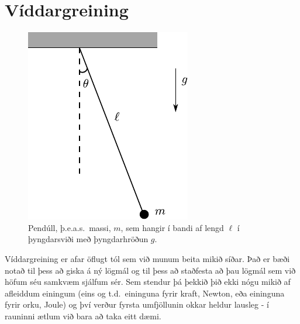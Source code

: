 \section{Víddargreining}


\begin{minipage}{\linewidth}
    

\begin{figure}
\vspace{-1cm}
\centering
\includegraphics{figures/pendull.pdf}
\caption{Pendúll, þ.e.a.s.~massi, $m$, sem hangir í bandi af lengd $\ell$ í þyngdarsviði með þyngdarhröðun $g$.}
\label{fig:pendull}
\end{figure}

Víddargreining er afar öflugt tól sem við munum beita mikið síðar. Það er bæði notað til þess að giska á ný lögmál og til þess að staðfesta að þau lögmál sem við höfum séu samkvæm sjálfum sér. Sem stendur þá þekkið þið ekki nógu mikið af afleiddum einingum (eins og t.d.~eininguna fyrir kraft, Newton, eða eininguna fyrir orku, Joule) og því verður fyrsta umfjöllunin okkar heldur lausleg - í rauninni ætlum við bara að taka eitt dæmi.

\vspace{0.2cm}


\end{minipage}
